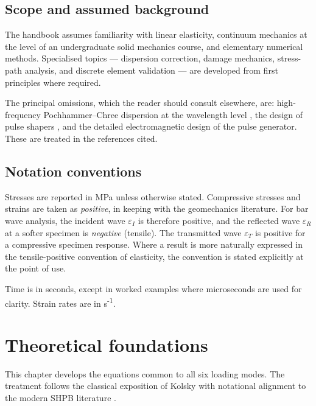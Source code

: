 \documentclass[11pt,a4paper,openany]{book}
\theoremstyle{handbook}
\newcommand{\eps}{\varepsilon}
\begin{document}
\section{Scope and assumed background}

The handbook assumes familiarity with linear elasticity, continuum mechanics
at the level of an undergraduate solid mechanics course, and elementary
numerical methods. Specialised topics --- dispersion correction, damage
mechanics, stress-path analysis, and discrete element validation --- are
developed from first principles where required.

The principal omissions, which the reader should consult elsewhere, are:
high-frequency Pochhammer--Chree dispersion at the wavelength level
\cite{Davies1948,GrahamPC}, the design of pulse shapers
\cite{FrewForrestal2002}, and the detailed electromagnetic design of the
pulse generator. These are treated in the references cited.

\section{Notation conventions}

Stresses are reported in MPa unless otherwise stated. Compressive stresses
and strains are taken as \emph{positive}, in keeping with the geomechanics
literature. For bar wave analysis, the incident wave $\eps_I$ is therefore
positive, and the reflected wave $\eps_R$ at a softer specimen is
\emph{negative} (tensile). The transmitted wave $\eps_T$ is positive for a
compressive specimen response. Where a result is more naturally expressed in
the tensile-positive convention of elasticity, the convention is stated
explicitly at the point of use.

Time is in seconds, except in worked examples where microseconds are used for
clarity. Strain rates are in s\textsuperscript{-1}.

\chapter{Theoretical foundations}\label{ch:foundations}

This chapter develops the equations common to all six loading modes. The
treatment follows the classical exposition of Kolsky \cite{Kolsky1949,Kolsky1963}
with notational alignment to the modern SHPB literature
\cite{ChenSong2011,GrayHandbook}.
\end{document}
